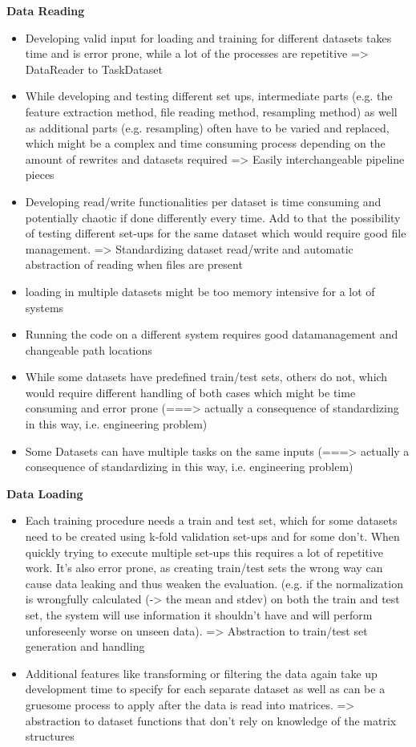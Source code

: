 \textbf{Data Reading}
\begin{itemize}
	\item Developing valid input for loading and training for different datasets takes time and is error prone, while a lot of the processes are repetitive => DataReader to TaskDataset
	\item While developing and testing different set ups, intermediate parts (e.g. the feature extraction method, file reading method, resampling method) as well as additional parts (e.g. resampling) often have to be varied and replaced, which might be a complex and time consuming process depending on the amount of rewrites and datasets required => Easily interchangeable pipeline pieces
	\item Developing read/write functionalities per dataset is time consuming and potentially chaotic if done differently every time. Add to that the possibility of testing different set-ups for the same dataset which would require good file management. => Standardizing dataset read/write and automatic abstraction of reading when files are present
	
	\item loading in multiple datasets might be too memory intensive for a lot of systems 
	\item Running the code on a different system requires good datamanagement and changeable path locations
	\item While some datasets have predefined train/test sets, others do not, which would require different handling of both cases which might be time consuming and error prone (===> actually a consequence of standardizing in this way, i.e. engineering problem)
	\item Some Datasets can have multiple tasks on the same inputs (===> actually a consequence of standardizing in this way, i.e. engineering problem)
\end{itemize}

\textbf{Data Loading}
\begin{itemize}
	\item Each training procedure needs a train and test set, which for some datasets need to be created using k-fold validation set-ups and for some don't. When quickly trying to execute multiple set-ups this requires a lot of repetitive work. It's also error prone, as creating train/test sets the wrong way can cause data leaking and thus weaken the evaluation. (e.g. if the normalization is wrongfully calculated (-> the mean and stdev) on both the train and test set, the system will use information it shouldn't have and will perform unforeseenly worse on unseen data). => Abstraction to train/test set generation and handling
	\item Additional features like transforming or filtering the data again take up development time to specify for each separate dataset as well as can be a gruesome process to apply after the data is read into matrices. => abstraction to dataset functions that don't rely on knowledge of the matrix structures
\end{itemize}

